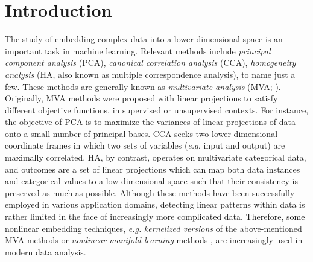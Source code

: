 \documentclass[a4paper]{article}
\begin{document}
\section{Introduction}
\label{sec:introduction}
The study of embedding complex data into a lower-dimensional space is an important task in machine learning.  
Relevant methods include \emph{principal component analysis} (PCA), \emph{canonical correlation analysis} (CCA), \emph{homogeneity analysis} (HA, also known as multiple correspondence 
analysis), to name just a few.  These methods are generally known as \emph{multivariate analysis} (MVA; \citeauthor{MVA_book} \citeyear{MVA_book}).   
Originally, MVA methods were proposed with linear projections to satisfy different objective functions, in supervised or unsupervised contexts. For instance, the objective of PCA is 
to maximize the variances of linear projections of data onto a small number of principal bases.
CCA seeks two lower-dimensional coordinate frames in which two sets of variables (\emph{e.g.} input and output) are maximally correlated. HA, by contrast, operates 
on multivariate categorical data, and outcomes are a set of linear projections which can map both data instances and categorical values to a low-dimensional space such 
that their consistency is preserved as much as possible.                  
Although these methods have been successfully employed in various application domains, detecting linear patterns within data is rather limited in the face of
increasingly more complicated data. Therefore, some nonlinear embedding techniques, \emph{e.g.} \emph{kernelized versions} 
of the above-mentioned MVA methods or \emph{nonlinear manifold learning} methods \citep{Manifold_Learning}, 
are increasingly used in modern data analysis.  
\end{document}
